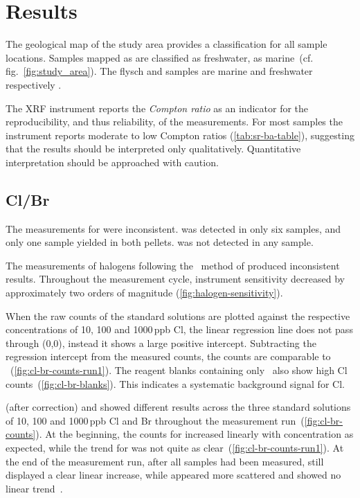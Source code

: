 \chapter{Results}\label{sec:results}

The geological map of the study area \parencite{Linth_Map} provides a classification for 
all sample locations. Samples mapped as \USM are classified as freshwater,
\UMM as marine~(cf. fig.~\ref{fig:study_area}). The flysch and \OSM samples are marine and 
freshwater respectively \parencite{Linth_Text,gubler_2009e}. 

The XRF instrument reports the \emph{Compton ratio} as an indicator for the reproducibility,
and thus reliability, of the measurements. For most samples the instrument reports moderate to low 
Compton ratios (\cref{tab:sr-ba-table}), 
suggesting that the results should be interpreted only qualitatively.
Quantitative interpretation should be approached with caution.

\section{Cl/Br}

The \XRF measurements for  were inconsistent.  was detected in only six samples,
and only one sample yielded  in both pellets. 
 was not detected in any sample. 

The \ICPMS measurements of halogens following the \ambif\ method of \textcite{he_determination_2019}
produced inconsistent results. Throughout the measurement cycle, instrument sensitivity
decreased by approximately two orders of magnitude (\cref{fig:halogen-sensitivity}).

When the raw  counts of the standard solutions are plotted
against the respective concentrations of 10, 100 and 1000\,ppb Cl, the linear regression line does not
pass through (0,0), instead it shows a large positive intercept. Subtracting the regression intercept
from the measured counts, the  counts are comparable to ~(\cref{fig:cl-br-counts-run1}).
The reagent blanks containing only \ambif\ also show high Cl counts~(\cref{fig:cl-br-blanks}).
This indicates a systematic background signal for Cl.

 (after correction) and  showed different results across the three standard solutions
of 10, 100 and 1000\,ppb Cl and Br throughout the measurement run~(\cref{fig:cl-br-counts}).
At the beginning, the counts for  increased linearly with concentration as expected, 
while the trend for  was not quite as clear~(\cref{fig:cl-br-counts-run1}).
At the end of the measurement run, after all samples had been measured,  still displayed a clear linear
increase, while  appeared more scattered and showed no linear trend~.

